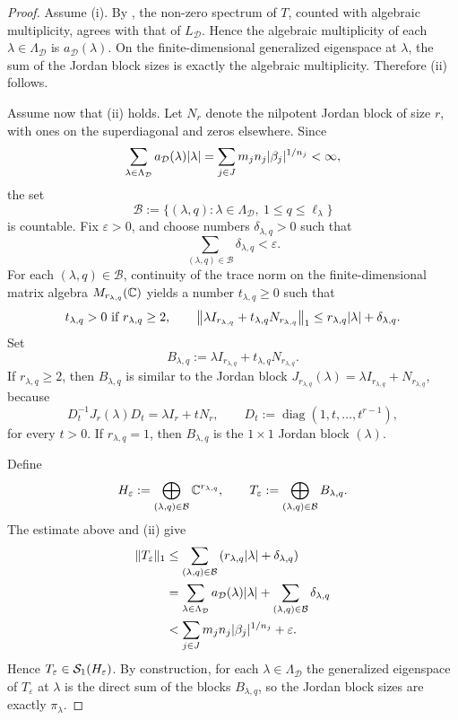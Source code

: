\begin{proof}
  Assume \textup{(i)}. By
  , the non-zero spectrum of \(T\),
  counted with algebraic multiplicity, agrees with that of
  \(L_{\mathcal D}\). Hence the algebraic multiplicity of each
  \(\lambda\in \Lambda_{\mathcal D}\) is
  \(a_{\mathcal D}(\lambda)\). On the finite-dimensional generalized
  eigenspace at \(\lambda\), the sum of the Jordan block sizes is
  exactly the algebraic multiplicity. Therefore \textup{(ii)} follows.

  Assume now that \textup{(ii)} holds. Let \(N_r\) denote the nilpotent
  Jordan block of size \(r\), with ones on the superdiagonal and zeros
  elsewhere. Since
  \[
    \sum_{\lambda\in \Lambda_{\mathcal D}}
      a_{\mathcal D}(\lambda)\lvert \lambda \rvert
    =\sum_{j\in J}m_jn_j\lvert \beta_j \rvert^{1/n_j}
    <\infty,
  \]
  the set
  \[
    \mathcal B
    :=\{(\lambda,q):\lambda\in\Lambda_{\mathcal D},
      \ 1\le q\le \ell_\lambda\}
  \]
  is countable. Fix \(\varepsilon>0\), and choose numbers
  \(\delta_{\lambda,q}>0\) such that
  \[
    \sum_{(\lambda,q)\in\mathcal B}\delta_{\lambda,q}<\varepsilon.
  \]
  For each \((\lambda,q)\in\mathcal B\), continuity of the trace norm on
  the finite-dimensional matrix algebra
  \(M_{r_{\lambda,q}}(\mathbb{C})\) yields a number \(t_{\lambda,q}\ge 0\) such
  that
  \[
    t_{\lambda,q}>0 \text{ if } r_{\lambda,q}\ge 2,
    \qquad
    \left\|\lambda I_{r_{\lambda,q}}
      +t_{\lambda,q}N_{r_{\lambda,q}}\right\|_1
    \le r_{\lambda,q}\lvert \lambda \rvert+\delta_{\lambda,q}.
  \]
  Set
  \[
    B_{\lambda,q}
    :=\lambda I_{r_{\lambda,q}}+t_{\lambda,q}N_{r_{\lambda,q}}.
  \]
  If \(r_{\lambda,q}\ge 2\), then \(B_{\lambda,q}\) is similar to the
  Jordan block \(J_{r_{\lambda,q}}(\lambda)=\lambda I_{r_{\lambda,q}}
  +N_{r_{\lambda,q}}\), because
  \[
    D_t^{-1}J_r(\lambda)D_t=\lambda I_r+tN_r,
    \qquad
    D_t:=\operatorname{diag}(1,t,\dots,t^{r-1}),
  \]
  for every \(t>0\). If \(r_{\lambda,q}=1\), then \(B_{\lambda,q}\) is
  the \(1\times 1\) Jordan block \((\lambda)\).

  Define
  \[
    H_\varepsilon
    :=\bigoplus_{(\lambda,q)\in\mathcal B}\mathbb{C}^{r_{\lambda,q}},
    \qquad
    T_\varepsilon
    :=\bigoplus_{(\lambda,q)\in\mathcal B}B_{\lambda,q}.
  \]
  The estimate above and \textup{(ii)} give
  \begin{align*}
    \|T_\varepsilon\|_1
    &\le \sum_{(\lambda,q)\in\mathcal B}
      \left(r_{\lambda,q}\lvert \lambda \rvert+\delta_{\lambda,q}\right) \\
    &= \sum_{\lambda\in \Lambda_{\mathcal D}}
      a_{\mathcal D}(\lambda)\lvert \lambda \rvert
      +\sum_{(\lambda,q)\in\mathcal B}\delta_{\lambda,q} \\
    &< \sum_{j\in J}m_jn_j\lvert \beta_j \rvert^{1/n_j}+\varepsilon.
  \end{align*}
  Hence \(T_\varepsilon\in \mathcal S_1(H_\varepsilon)\). By construction, for
  each \(\lambda\in \Lambda_{\mathcal D}\) the generalized eigenspace of
  \(T_\varepsilon\) at \(\lambda\) is the direct sum of the blocks
  \(B_{\lambda,q}\), so the Jordan block sizes are exactly
  \(\pi_\lambda\).


\end{proof}
